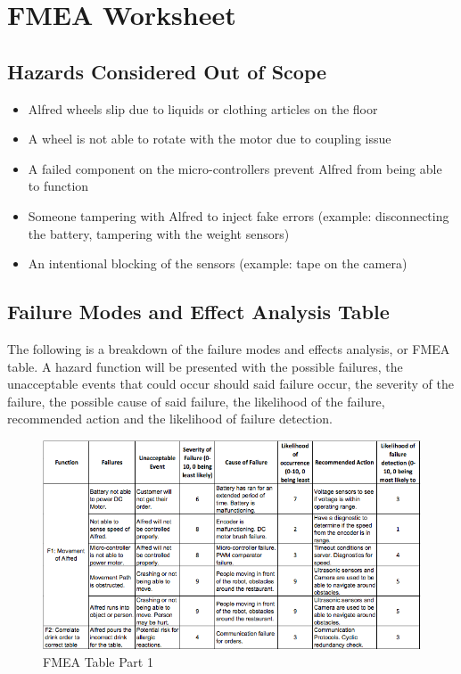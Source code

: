 \documentclass [10pt]{article}
\begin{document}
\pagebreak


\section{FMEA Worksheet}

\subsection{Hazards Considered Out of Scope}

\begin{itemize}
	\item Alfred wheels slip due to liquids or clothing articles on the floor
	\item A wheel is not able to rotate with the motor due to coupling issue
	\item A failed component on the micro-controllers prevent Alfred from being able to function
	\item Someone tampering with Alfred to inject fake errors (example: disconnecting the battery, tampering with the weight sensors)
	\item An intentional blocking of the sensors (example: tape on the camera)
\end{itemize}

\subsection{Failure Modes and Effect Analysis Table}
The following is a breakdown of the failure modes and effects analysis, or FMEA table. A hazard function will be presented with the possible failures, the unacceptable events that could occur should said failure occur, the severity of the failure, the possible cause of said failure, the likelihood of the failure, recommended action and the likelihood of failure detection.

\begin{figure} [H]
	\centering
	\includegraphics [scale = 0.7] {figures/FMEA_1.png}
	\caption{FMEA Table Part 1}
\end{figure}
\end{document}
